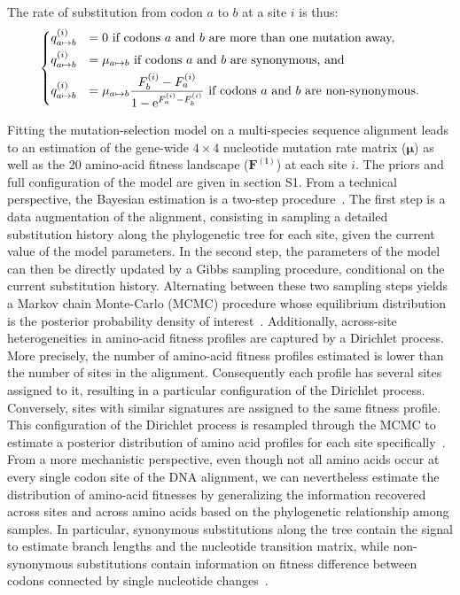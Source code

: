 \documentclass[9pt,twocolumn,twoside,lineno]{pnas-new}
\newcommand{\UniDimArray}[1]{\bm{#1}}
\newcommand{\e}{\text{e}}
\begin{document}
{       The rate of substitution from codon $a$ to $b$ at a site $i$ is thus:
       \begin{equation}
              \begin{dcases}
                     q_{a \mapsto b}^{(i)} & = 0 \text{ if codons $a$ and $b$ are more than one mutation away,} \\
                     q_{a \mapsto b}^{(i)} & = \mu_{a \mapsto b} \text{ if codons $a$ and $b$ are synonymous, and}\\
                     q_{a \mapsto b}^{(i)} & = \mu_{a \mapsto b} \dfrac{F_b^{(i)} - F_a^{(i)}}{1 - \e^{F_a^{(i)} - F_b^{(i)}}} \text{ if codons $a$ and $b$ are non-synonymous}.
              \end{dcases}
       \end{equation}

       Fitting the mutation-selection model on a multi-species sequence alignment leads to an estimation of the gene-wide $4 \times 4$ nucleotide mutation rate matrix ($\UniDimArray{\mu}$) as well as the $20$ amino-acid fitness landscape ($\UniDimArray{F^{(i)}}$) at each site $i$.
       The priors and full configuration of the model are given in section S1.
       From a technical perspective, the Bayesian estimation is a two-step procedure~\cite{rodrigue_bayesian_2008}.
       The first step is a data augmentation of the alignment, consisting in sampling a detailed substitution history along the phylogenetic tree for each site, given the current value of the model parameters.
       In the second step, the parameters of the model can then be directly updated by a Gibbs sampling procedure, conditional on the current substitution history.
       Alternating between these two sampling steps yields a Markov chain Monte-Carlo (MCMC) procedure whose equilibrium distribution is the posterior probability density of interest~\cite{lartillot_bayesian_2004, rodrigue_bayesian_2008}.
       Additionally, across-site heterogeneities in amino-acid fitness profiles are captured by a Dirichlet process.
       More precisely, the number of amino-acid fitness profiles estimated is lower than the number of sites in the alignment.
       Consequently each profile has several sites assigned to it, resulting in a particular configuration of the Dirichlet process.
       Conversely, sites with similar signatures are assigned to the same fitness profile.
       This configuration of the Dirichlet process is resampled through the MCMC to estimate a posterior distribution of amino acid profiles for each site specifically~\cite{rodrigue_mutationselection_2010, lartillot_inference_2013}.
       From a more mechanistic perspective, even though not all amino acids occur at every single codon site of the DNA alignment, we can nevertheless estimate the distribution of amino-acid fitnesses by generalizing the information recovered across sites and across amino acids based on the phylogenetic relationship among samples.
       In particular, synonymous substitutions along the tree contain the signal to estimate branch lengths and the nucleotide transition matrix, while non-synonymous substitutions contain information on fitness difference between codons connected by single nucleotide changes~\cite{rodrigue_mutationselection_2010}.

}
\end{document}
